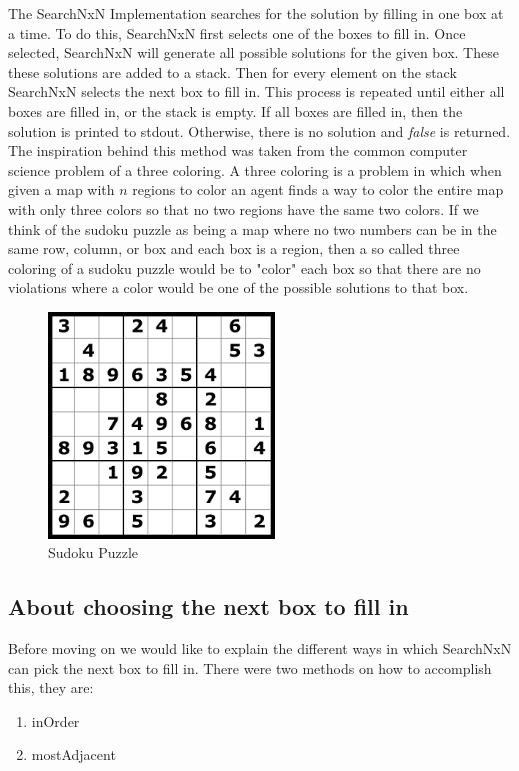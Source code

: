 \documentclass[letterpaper]{article}
\begin{document}
The SearchNxN Implementation searches for the solution by filling in one box at a time. To do this, SearchNxN first selects one of the boxes to fill in. Once selected, SearchNxN will generate all possible solutions for the given box. These these solutions are added to a stack. Then for every element on the stack SearchNxN selects the next box to fill in. This process is repeated until either all boxes are filled in, or the stack is empty. If all boxes are filled in, then the solution is printed to stdout. Otherwise, there is no solution and \emph{false} is returned. The inspiration behind this method was taken from the common computer science problem of a three coloring. A three coloring is a problem in which when given a map with $n$ regions to color an agent finds a way to color the entire map with only three colors so that no two regions have the same two colors. If we think of the sudoku puzzle as being a map where no two numbers can be in the same row, column, or box and each box is a region, then a so called three coloring of a sudoku puzzle would be to "color" each box so that there are no violations where a color would be one of the possible solutions to that box.

\begin{figure}[h]
	\centering
	\includegraphics[width=60mm]{./Sudoku-games.png}
	\caption{Sudoku Puzzle}
	\label{fig:sudoku-puzzle}
\end{figure}

\subsection{About choosing the next box to fill in}

Before moving on we would like to explain the different ways in which SearchNxN can pick the next box to fill in. There were two methods on how to accomplish this, they are:

\begin{enumerate}
  \item inOrder
  \item mostAdjacent
\end{enumerate}
\end{document}
